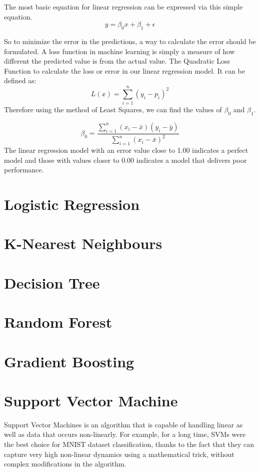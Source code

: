 \documentclass[12pt]{article}
\begin{document}
The most basic equation for linear regression can be expressed via this simple equation.
$$y = \beta_{0}x+\beta_{1}+\epsilon$$

So to minimize the error in the predictions, a way to calculate the error should be formulated. A loss function in machine learning is simply a measure of how different the predicted value is from the actual value. The Quadratic Loss Function to calculate the loss or error in our linear regression model. It can be defined as:
$$L(x) = \sum_{i=1}^{n}(y_{i}-p_{i})^{2} $$
Therefore using the method of Least Squares, we can find the values of $\beta_{0}$ and $\beta_{1}$.

$$\beta_{0} = \frac{\sum_{i=1}^{n} ( x_{i}-\bar{x}) (y_{i}-\bar{y})}{\sum_{i=1}^{n} ( x_{i}-\bar{x})^{2} }
$$
The linear regression model with an error value close to 1.00 indicates a perfect model and those with values closer to 0.00 indicates a model that delivers poor performance.

\newpage
\section{Logistic Regression}

\newpage
\section{K-Nearest Neighbours}

\newpage
\section{Decision Tree}

\newpage
\section{Random Forest}

\newpage
\section{Gradient Boosting}

\newpage
\section{Support Vector Machine}
Support Vector Machines is an algorithm that is capable of handling 
linear as well as data that occurs non-linearly. For example, for a long time, SVMs were the best
choice for MNIST dataset classification, thanks to the fact that they can capture very high
non-linear dynamics using a mathematical trick, without complex modifications in the
algorithm.
\end{document}
